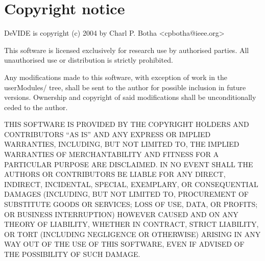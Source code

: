 
%
%
\newcommand{\commandref}[2]{\helpref{{\tt $\backslash$#1}}{#2}}%
\newcommand{\commandrefn}[2]{\helprefn{{\tt $\backslash$#1}}{#2}\index{#1}}%
\newcommand{\commandpageref}[2]{\latexignore{\helprefn{{\tt $\backslash$#1}}{#2}}\latexonly{{\tt $\backslash$#1} {\it page \pageref{#2}}}\index{#1}}%
\newcommand{\indexit}[1]{#1\index{#1}}%
\newcommand{\inioption}[1]{{\bf {\tt #1}}\index{#1}}%
\parskip=10pt%
\parindent=0pt%
%
%
\makeindex%
%
\maketitle%
\pagestyle{fancyplain}%
%
%
%
\setfooter{\thepage}{}{}{}{}{\thepage}%
\tableofcontents%

\chapter*{Copyright notice}%
%
\setfooter{\thepage}{}{}{}{}{\thepage}%
DeVIDE is copyright (c) 2004 by Charl P. Botha <cpbotha@ieee.org>

This software is licensed exclusively for research use by authorised
parties.  All unauthorised use or distribution is strictly prohibited.

Any modifications made to this software, with exception of work in the
userModules/ tree, shall be sent to the author for possible inclusion
in future versions.  Ownership and copyright of said modifications
shall be unconditionally ceded to the author.

THIS SOFTWARE IS PROVIDED BY THE COPYRIGHT HOLDERS AND CONTRIBUTORS
``AS IS'' AND ANY EXPRESS OR IMPLIED WARRANTIES, INCLUDING, BUT NOT
LIMITED TO, THE IMPLIED WARRANTIES OF MERCHANTABILITY AND FITNESS FOR
A PARTICULAR PURPOSE ARE DISCLAIMED.  IN NO EVENT SHALL THE AUTHORS OR
CONTRIBUTORS BE LIABLE FOR ANY DIRECT, INDIRECT, INCIDENTAL, SPECIAL,
EXEMPLARY, OR CONSEQUENTIAL DAMAGES (INCLUDING, BUT NOT LIMITED TO,
PROCUREMENT OF SUBSTITUTE GOODS OR SERVICES; LOSS OF USE, DATA, OR
PROFITS; OR BUSINESS INTERRUPTION) HOWEVER CAUSED AND ON ANY THEORY OF
LIABILITY, WHETHER IN CONTRACT, STRICT LIABILITY, OR TORT (INCLUDING
NEGLIGENCE OR OTHERWISE) ARISING IN ANY WAY OUT OF THE USE OF THIS
SOFTWARE, EVEN IF ADVISED OF THE POSSIBILITY OF SUCH DAMAGE.

